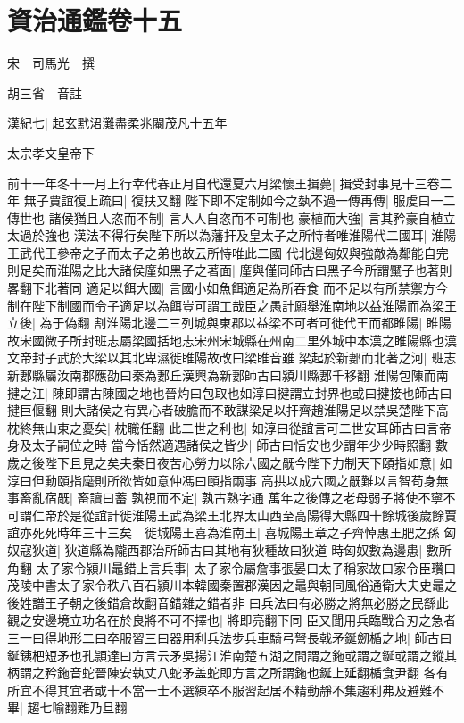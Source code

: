 \section{資治通鑑卷十五}
宋　司馬光　撰

胡三省　音註

漢紀七|{
	起玄黓涒灘盡柔兆閹茂凡十五年}


太宗孝文皇帝下

前十一年冬十一月上行幸代春正月自代還夏六月梁懷王揖薨|{
	揖受封事見十三卷二年}
無子賈誼復上疏曰|{
	復扶又翻}
陛下即不定制如今之埶不過一傳再傳|{
	服䖍曰一二傳世也}
諸侯猶且人恣而不制|{
	言人人自恣而不可制也}
豪植而大強|{
	言其矜豪自植立太過於強也}
漢法不得行矣陛下所以為藩扞及皇太子之所恃者唯淮陽代二國耳|{
	淮陽王武代王參帝之子而太子之弟也故云所恃唯此二國}
代北邊匈奴與強敵為鄰能自完則足矣而淮陽之比大諸侯廑如黑子之著面|{
	廑與僅同師古曰黑子今所謂黶子也著則畧翻下北著同}
適足以餌大國|{
	言國小如魚餌適足為所吞食}
而不足以有所禁禦方今制在陛下制國而令子適足以為餌豈可謂工哉臣之愚計願舉淮南地以益淮陽而為梁王立後|{
	為于偽翻}
割淮陽北邊二三列城與東郡以益梁不可者可徙代王而都睢陽|{
	睢陽故宋國微子所封班志屬梁國括地志宋州宋城縣在州南二里外城中本漢之睢陽縣也漢文帝封子武於大梁以其北卑濕徙睢陽故改曰梁睢音雖}
梁起於新郪而北著之河|{
	班志新郪縣屬汝南郡應劭曰秦為郪丘漢興為新郪師古曰潁川縣郪千移翻}
淮陽包陳而南揵之江|{
	陳即謂古陳國之地也晉灼曰包取也如淳曰揵謂立封界也或曰揵接也師古曰揵巨偃翻}
則大諸侯之有異心者破膽而不敢謀梁足以扞齊趙淮陽足以禁吳楚陛下高枕終無山東之憂矣|{
	枕職任翻}
此二世之利也|{
	如淳曰從誼言可二世安耳師古曰言帝身及太子嗣位之時}
當今恬然適遇諸侯之皆少|{
	師古曰恬安也少謂年少少時照翻}
數歲之後陛下且見之矣夫秦日夜苦心勞力以除六國之旤今陛下力制天下頤指如意|{
	如淳曰但動頤指麾則所欲皆如意仲馮曰頤指兩事}
高拱以成六國之旤難以言智苟身無事畜亂宿旤|{
	畜讀曰蓄}
孰視而不定|{
	孰古熟字通}
萬年之後傳之老母弱子將使不寧不可謂仁帝於是從誼計徙淮陽王武為梁王北界太山西至高陽得大縣四十餘城後歲餘賈誼亦死死時年三十三矣　徙城陽王喜為淮南王|{
	喜城陽王章之子齊悼惠王肥之孫}
匈奴寇狄道|{
	狄道縣為隴西郡治所師古曰其地有狄種故曰狄道}
時匈奴數為邊患|{
	數所角翻}
太子家令潁川鼂錯上言兵事|{
	太子家令屬詹事張晏曰太子稱家故曰家令臣瓚曰茂陵中書太子家令秩八百石潁川本韓國秦置郡漢因之鼂與朝同風俗通衛大夫史鼂之後姓譜王子朝之後錯倉故翻音錯雜之錯者非}
曰兵法曰有必勝之將無必勝之民繇此觀之安邊境立功名在於良將不可不擇也|{
	將即亮翻下同}
臣又聞用兵臨戰合刃之急者三一曰得地形二曰卒服習三曰器用利兵法步兵車騎弓弩長戟矛鋋劒楯之地|{
	師古曰鋋銕杷短矛也孔頴達曰方言云矛吳揚江淮南楚五湖之間謂之鉇或謂之鋋或謂之鏦其柄謂之矜鉇音蛇晉陳安執丈八蛇矛盖蛇即方言之所謂鉇也鋋上延翻楯食尹翻}
各有所宜不得其宜者或十不當一士不選練卒不服習起居不精動靜不集趨利弗及避難不畢|{
	趨七喻翻難乃旦翻}
